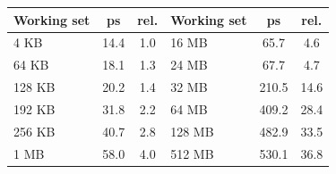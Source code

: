 \begin{tabular}{lcc@{\hspace{2em}}lcc}
\toprule
Working set & ps & rel. & Working set & ps & rel. \\
\midrule
4 KB & 14.4 & 1.0 & 16 MB & 65.7 & 4.6 \\
64 KB & 18.1 & 1.3 & 24 MB & 67.7 & 4.7 \\
128 KB & 20.2 & 1.4 & 32 MB & 210.5 & 14.6 \\
192 KB & 31.8 & 2.2 & 64 MB & 409.2 & 28.4 \\
256 KB & 40.7 & 2.8 & 128 MB & 482.9 & 33.5 \\
1 MB & 58.0 & 4.0 & 512 MB & 530.1 & 36.8 \\
\bottomrule
\end{tabular}
